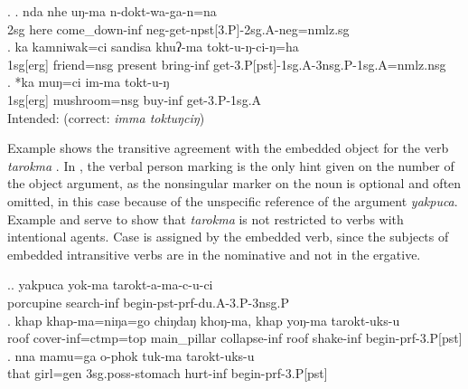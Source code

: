 \ex. \ag. nda nhe uŋ-ma n-dokt-wa-ga-n=na\\
{\sc 2sg} here come\_down-{\sc inf} {\sc neg}-get{\sc -npst[3.P]-2sg.A-neg=nmlz.sg}\\
 
\bg. ka kamniwak=ci sandisa  khuʔ-ma tokt-u-ŋ-ci-ŋ=ha\\
{\sc 1sg[erg]} friend{\sc =nsg} present bring-{\sc inf} get-{\sc 3.P[pst]-1sg.A-3nsg.P-1sg.A=nmlz.nsg}\\
	\bg. *ka muŋ=ci im-ma tokt-u-ŋ\\
		{\sc 1sg[erg]} mushroom{\sc =nsg} buy{\sc -inf} get-{\sc 3.P-1sg.A}\\
	Intended:   (correct: \emph{imma toktuŋciŋ})


Example \Next shows the transitive agreement with the embedded object for the verb \emph{tarokma} . In \Next[a], the verbal person marking is the only hint given on the number of the object argument, as the nonsingular marker on the noun is optional and often omitted, in this case because of  the unspecific reference of the argument \emph{yakpuca}. Example \Next[b] and \Next[c] serve to show  that \emph{tarokma} is  not restricted to verbs with intentional agents. 
Case is assigned by the embedded verb, since the subjects of embedded intransitive verbs are in the nominative and not in the ergative. 


\ex.\ag. yakpuca yok-ma tarokt-a-ma-c-u-ci\\
porcupine search-{\sc inf} begin{\sc -pst-prf-du.A-3.P-3nsg.P}\\
\bg. khap khap-ma=niŋa=go chiŋdaŋ  khoŋ-ma,  khap yoŋ-ma tarokt-uks-u\\
		roof cover{\sc -inf=ctmp=top} main\_pillar collapse{\sc -inf} 	roof  shake{\sc -inf} begin{\sc [3sg.A]-prf-3.P[pst]}	\\
	 
\bg. nna  mamu=ga    o-phok            tuk-ma           tarokt-uks-u\\
that girl{\sc =gen} {\sc 3sg.poss-}stomach hurt{\sc -inf} begin{\sc [3sg.A]-prf-3.P[pst]}\\
 



